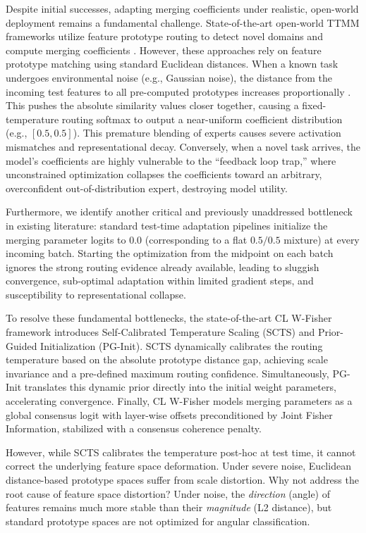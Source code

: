 \documentclass{article}
\theoremstyle{plain}
\theoremstyle{definition}
\theoremstyle{remark}
\begin{document}
Despite initial successes, adapting merging coefficients under realistic, open-world deployment remains a fundamental challenge. State-of-the-art open-world TTMM frameworks utilize feature prototype routing to detect novel domains and compute merging coefficients \cite{hubotter2025coacting, dfbayes2025data}. However, these approaches rely on feature prototype matching using standard Euclidean distances. When a known task undergoes environmental noise (e.g., Gaussian noise), the distance from the incoming test features to all pre-computed prototypes increases proportionally \cite{hendrycks2019robustness}. This pushes the absolute similarity values closer together, causing a fixed-temperature routing softmax to output a near-uniform coefficient distribution (e.g., $[0.5, 0.5]$). This premature blending of experts causes severe activation mismatches and representational decay. Conversely, when a novel task arrives, the model's coefficients are highly vulnerable to the ``feedback loop trap,'' where unconstrained optimization collapses the coefficients toward an arbitrary, overconfident out-of-distribution expert, destroying model utility.

Furthermore, we identify another critical and previously unaddressed bottleneck in existing literature: standard test-time adaptation pipelines initialize the merging parameter logits to $0.0$ (corresponding to a flat $0.5/0.5$ mixture) at every incoming batch. Starting the optimization from the midpoint on each batch ignores the strong routing evidence already available, leading to sluggish convergence, sub-optimal adaptation within limited gradient steps, and susceptibility to representational collapse.

To resolve these fundamental bottlenecks, the state-of-the-art CL W-Fisher framework \cite{hubotter2025coacting} introduces Self-Calibrated Temperature Scaling (SCTS) and Prior-Guided Initialization (PG-Init). SCTS dynamically calibrates the routing temperature based on the absolute prototype distance gap, achieving scale invariance and a pre-defined maximum routing confidence. Simultaneously, PG-Init translates this dynamic prior directly into the initial weight parameters, accelerating convergence. Finally, CL W-Fisher models merging parameters as a global consensus logit with layer-wise offsets preconditioned by Joint Fisher Information, stabilized with a consensus coherence penalty.

However, while SCTS calibrates the temperature post-hoc at test time, it cannot correct the underlying feature space deformation. Under severe noise, Euclidean distance-based prototype spaces suffer from scale distortion. Why not address the root cause of feature space distortion? Under noise, the \textit{direction} (angle) of features remains much more stable than their \textit{magnitude} (L2 distance), but standard prototype spaces are not optimized for angular classification.
\end{document}

